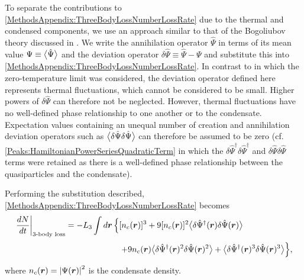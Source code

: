 To separate the contributions to \eqref{MethodsAppendix:ThreeBodyLossNumberLossRate} due to the thermal and condensed components, we use an approach similar to that of the Bogoliubov theory discussed in .  We write the annihilation operator $\hat{\Psi}$ in terms of its mean value $\Psi \equiv {\ensuremath{\big<\hat{\Psi}\big>}}$ and the deviation operator $\delta \hat{\Psi} \equiv \hat{\Psi} - \Psi$ and substitute this into \eqref{MethodsAppendix:ThreeBodyLossNumberLossRate}.  In contrast to  in which the zero-temperature limit was considered, the deviation operator defined here represents thermal fluctuations, which cannot be considered to be small.  Higher powers of $\delta\hat{\Psi}$ can therefore not be neglected.  However, thermal fluctuations have no well-defined phase relationship to one another or to the condensate.  Expectation values containing an unequal number of creation and annihilation deviation operators such as ${\big<\delta\hat{\Psi}\delta\hat{\Psi}\big>}$ can therefore be assumed to be zero (cf. \eqref{Peaks:HamiltonianPowerSeriesQuadraticTerm} in which the $\delta\hat{\Psi}^\dagger \delta\hat{\Psi}^\dagger$ and $\delta\hat{\Psi}\delta\hat{\Psi}$ terms were retained as there is a well-defined phase relationship between the quasiparticles and the condensate).

Performing the substitution described, \eqref{MethodsAppendix:ThreeBodyLossNumberLossRate} becomes
\begin{align}
    \begin{split}
        \left.\frac{d N}{dt} \right|_\text{3-body loss} &=  -L_3 \int d \bm{r}\, \Big\{[n_c(\bm{r})]^3 + 9 [n_c(\bm{r})]^2 \mean{\delta\hat{\Psi}^\dagger(\bm{r}) \delta\hat{\Psi}(\bm{r})}\\
        &\relphantom{=-L_3 \int d \bm{r}\,\Big\{} + 9 n_c(\bm{r}) \mean{\delta\hat{\Psi}^\dagger(\bm{r})^2 \delta\hat{\Psi}(\bm{r})^2} + \mean{\delta\hat{\Psi}^\dagger(\bm{r})^3 \delta\hat{\Psi}(\bm{r})^3}\Big\},
    \end{split}
    \label{MethodsAppendix:ThreeBodyLossNumberLossRateInTermsOfDeviationOperators}
\end{align}
where $n_c(\bm{r}) = \left|\Psi(\bm{r})\right|^2$ is the condensate density.

